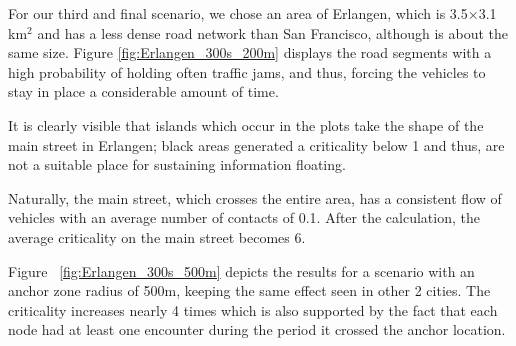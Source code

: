 For our third and final scenario, we chose an area of Erlangen, which is
3.5$\times$3.1 km$^2$ and has a less dense road network than San Francisco,
although is about the same size. Figure \ref{fig:Erlangen_300s_200m} displays
the road segments with a high probability of holding often traffic jams, and
thus, forcing the vehicles to stay in place a considerable amount of time.

It is clearly visible that islands which occur in the plots take the shape of
the main street in Erlangen; black areas generated a criticality below 1 and
thus, are not a suitable place for sustaining information floating.

Naturally, the main street, which crosses the entire area, has a consistent flow
of vehicles with an average number of contacts of 0.1. After the calculation,
the average criticality on the main street becomes 6.

Figure ~\ref{fig:Erlangen_300s_500m} depicts the results for a scenario with an
anchor zone radius of 500m, keeping the same effect seen in other 2 cities. The
criticality increases nearly 4 times which is also supported by the fact that
each node had at least one encounter during the period it crossed the anchor
location.

